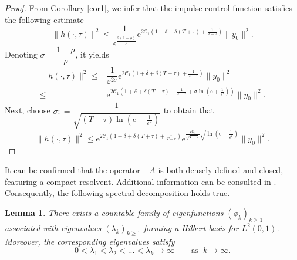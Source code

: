 \documentclass[sn-mathphys]{sn-jnl}
\newtheorem{lemma}[theorem]{Lemma}
\begin{document}
\begin{proof}
    From Corollary \ref{cor1}, we infer that the impulse control function satisfies the following estimate
    \begin{equation*}
        \|h(\cdot,\tau)\|^2 \leq \dfrac{1}{\varepsilon^{\frac{2(1-\rho)}{\rho}}} \mathrm{e}^{2 \mathcal{C}_1\left(1+ \delta +\delta(T+\tau) +\frac{1}{T-\tau}\right)} \|y_0\|^2.
    \end{equation*}
    Denoting $\sigma =\dfrac{1-\rho}{\rho}$, it yields
    \begin{align*}
        \|h(\cdot,\tau)\|^2 
        \leq &\dfrac{1}{\varepsilon^{2\sigma }} \mathrm{e}^{2 \mathcal{C}_1 \left(1+ \delta +\delta(T+\tau) + \frac{1}{T-\tau}\right)} \|y_0\|^2\\
        \leq &\mathrm{e}^{2 \mathcal{C}_1 \left(1+ \delta +\delta(T+\tau) +\frac{1}{T-\tau} + \sigma \ln\left(\mathrm{e} + \frac{1}{\varepsilon^2}\right) \right)} \|y_0\|^2.
    \end{align*}
    Next, choose $\sigma: =\dfrac{1}{\sqrt{(T-\tau)\ln\left(\mathrm{e}+\frac{1}{\varepsilon^2}\right)}}$ to obtain that
    \begin{equation}\label{eqq1}
        \|h(\cdot,\tau)\|^2 \leq \mathrm{e}^{2 \mathcal{C}_1 \left(1+ \delta+ \delta(T+\tau) +\frac{1}{T-\tau}\right)} \mathrm{e}^{\frac{2 \mathcal{C}_1}{\sqrt{T-\tau}} \sqrt{\ln\left(\mathrm{e} + \frac{1}{\varepsilon^2}\right)}}\|y_0\|^2.
    \end{equation}
\end{proof}
It can be confirmed that the operator $-A$ is both densely defined and closed, featuring a compact resolvent. Additional information can be consulted in \citep{V}. Consequently, the following spectral decomposition holds true.
	\begin{lemma}\label{lmsp1}
		There exists a countable family of eigenfunctions $(\phi_k)_{k \geq 1}$ associated with eigenvalues $(\lambda_k)_{k \geq 1}$ forming a Hilbert basis for $L^2(0,1)$. Moreover, the corresponding eigenvalues satisfy
        \begin{equation*}
            0<\lambda_1< \lambda_2<...<\lambda_k \rightarrow \infty \qquad \text{as} \;\; k \rightarrow \infty.
        \end{equation*}
	\end{lemma}
\end{document}
